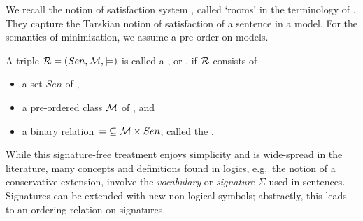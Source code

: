 \documentclass[10pt,%
\ifpretendfinal
final%
\else
draft%
\fi,
]{scrreprt}
\newcommand*{\syntax}[1]{\texttt{#1}}
\begin{document}




We recall the notion of satisfaction system
\cite{carnielli2008analysis}, called `rooms' in the terminology of
\cite{CharPar}. They capture the Tarskian notion of satisfaction of a
sentence in a model. For the semantics of minimization,
we assume a pre-order on models.

\begin{definition}\label{def:room}
A triple ${\cal R}=(Sen,{{\cal M},\models)}$  is called a  , or , if ${\cal R}$  consists of
\begin{itemize}
\item a set $Sen$ of ,
\item a pre-ordered class
${\cal M}$ of , and
\item a binary relation
${\models}\subseteq {\cal M} \times Sen$, called the .
\end{itemize}
\end{definition}


While this signature-free treatment enjoys simplicity and is
wide-spread in the literature, many concepts and definitions found in
logics, e.g.\ the notion of a conservative extension, involve the
\emph{vocabulary} or \emph{signature} $\Sigma$ \label{vocabulary} used
in sentences.  Signatures can be extended with new non-logical symbols;
abstractly, this leads to an ordering relation on signatures.
\end{document}
